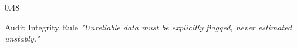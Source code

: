 \begin{frame}
\begin{columns}[T]
\begin{column}{0.48\textwidth}
      \vspace{0.1cm}
      \begin{statcard}{Audit Integrity Rule}
        \scriptsize \textit{"Unreliable data must be explicitly flagged, never estimated unstably."}
      \end{statcard}
    \end{column}
  \end{columns}
\end{frame}
